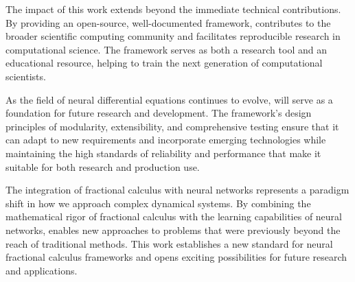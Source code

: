 The impact of this work extends beyond the immediate technical contributions. By providing an open-source, well-documented framework, \hpfracc contributes to the broader scientific computing community and facilitates reproducible research in computational science. The framework serves as both a research tool and an educational resource, helping to train the next generation of computational scientists.

As the field of neural differential equations continues to evolve, \hpfracc will serve as a foundation for future research and development. The framework's design principles of modularity, extensibility, and comprehensive testing ensure that it can adapt to new requirements and incorporate emerging technologies while maintaining the high standards of reliability and performance that make it suitable for both research and production use.

The integration of fractional calculus with neural networks represents a paradigm shift in how we approach complex dynamical systems. By combining the mathematical rigor of fractional calculus with the learning capabilities of neural networks, \hpfracc enables new approaches to problems that were previously beyond the reach of traditional methods. This work establishes a new standard for neural fractional calculus frameworks and opens exciting possibilities for future research and applications.
